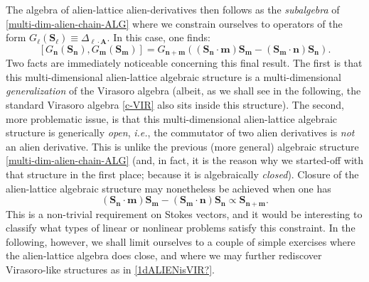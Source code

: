 \documentclass[11pt,a4paper]{article}
\newcommand{\be}{\begin{equation}}
\newcommand{\ee}{\end{equation}}
\begin{document}
The algebra of alien-lattice alien-derivatives then follows as the \textit{subalgebra} of \eqref{multi-dim-alien-chain-ALG} where we constrain ourselves to operators of the form $G_{\boldsymbol{\ell}} (\boldsymbol{S}_{\boldsymbol{\ell}}) \equiv \Delta_{\boldsymbol{\ell}\cdot\boldsymbol{A}}$. In this case, one finds:
%
\be
\label{eq:sec5-commutator-general-op-with stokes}
\left[ G_{\boldsymbol{n}} (\boldsymbol{S}_{\boldsymbol{n}}), G_{\boldsymbol{m}} (\boldsymbol{S}_{\boldsymbol{m}}) \right] = G_{\boldsymbol{n}+\boldsymbol{m}} \left( \left( \boldsymbol{S}_{\boldsymbol{n}} \cdot \boldsymbol{m} \right) \boldsymbol{S}_{\boldsymbol{m}} - \left( \boldsymbol{S}_{\boldsymbol{m}} \cdot \boldsymbol{n} \right) \boldsymbol{S}_{\boldsymbol{n}} \right).
\ee
%
\noindent
Two facts are immediately noticeable concerning this final result. The first is that this  multi-dimensional alien-lattice algebraic structure is a multi-dimensional \textit{generalization} of the Virasoro algebra (albeit, as we shall see in the following, the standard Virasoro algebra \eqref{c-VIR} also sits inside this structure). The second, more problematic issue, is that this multi-dimensional alien-lattice algebraic structure is generically \textit{open}, \textit{i.e.}, the commutator of two alien derivatives is \textit{not} an alien derivative. This is unlike the previous (more general) algebraic structure \eqref{multi-dim-alien-chain-ALG} (and, in fact, it is the reason why we started-off with that structure in the first place; because it is algebraically \textit{closed}). Closure of the alien-lattice algebraic structure may nonetheless be achieved when one has
%
\be
\label{closure-condition-stokes}
\left( \boldsymbol{S}_{\boldsymbol{n}} \cdot \boldsymbol{m} \right) \boldsymbol{S}_{\boldsymbol{m}} - \left( \boldsymbol{S}_{\boldsymbol{m}} \cdot \boldsymbol{n} \right) \boldsymbol{S}_{\boldsymbol{n}} \propto \boldsymbol{S}_{\boldsymbol{n}+\boldsymbol{m}}.
\ee
%
\noindent
This is a non-trivial requirement on Stokes vectors, and it would be interesting to classify what types of linear or nonlinear problems satisfy this constraint. In the following, however, we shall limit ourselves to a couple of simple exercises where the alien-lattice algebra does close, and where we may further rediscover Virasoro-like structures as in \eqref{1dALIENisVIR?}.
\end{document}
